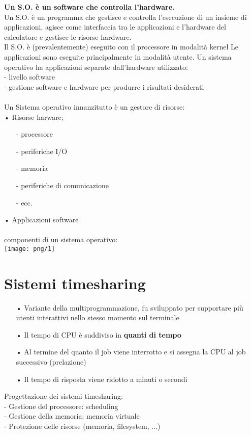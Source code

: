 \documentclass[12pt, letterpaper]{article}
\begin{document}
\textbf{Un S.O. è un software che controlla l'hardware.\\}
Un S.O. è un programma che gestisce e controlla l'esecuzione di un
insieme di applicazioni, agisce come interfaccia tra le applicazioni e
l'hardware del calcolatore e gestisce le risorse hardware.\\
Il S.O. è (prevalentemente) eseguito con il processore in modalità kernel
Le applicazioni sono eseguite principalmente in modalità utente. Un sistema operativo ha applicazioni separate dall'hardware utilizzato:
\\
- livello software\\
- gestione software e hardware per produrre i risultati desiderati
\\
\\
Un Sistema operativo innanzitutto è un gestore di risorse:\\
• Risorse harware;
\begin{itemize}
   \item[-] processore
   \item[-] periferiche I/O
   \item[-] memoria
   \item[-] periferiche di comunicazione
   \item[-] ecc.
\end{itemize}
• Applicazioni software\\
\\ componenti di un sistema operativo:\\
\texttt{[image: png/1]}\\

\section{Sistemi timesharing}

\begin{itemize}
   \item[•] Variante della multiprogrammazione, fu sviluppato per supportare più utenti interattivi nello stesso momento sul terminale
   \item[•] Il tempo di CPU è suddiviso in \textbf{quanti di tempo}
   \item[•] Al termine del quanto il job viene interrotto e si assegna la CPU al job
successivo (prelazione)
   \item[•] Il tempo di risposta viene ridotto a minuti o secondi 
\end{itemize}
Progettazione dei sistemi timesharing:
\\
- Gestione del processore: scheduling 
\\
- Gestione della memoria: memoria virtuale
\\
- Protezione delle risorse (memoria, filesystem, ...)
\end{document}
